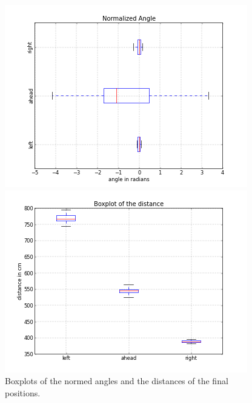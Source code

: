 \documentclass{scrartcl}
\begin{document}
\begin{figure}[H]
\centering
\begin{minipage}{.5\textwidth}
  \centering
  \includegraphics[width=.8\linewidth]{img/BoxplotAngleNorm_f.png}
\end{minipage}%
\begin{minipage}{.5\textwidth}
  \centering
  \includegraphics[width=.8\linewidth]{img/BoxplotDistance_f.png}
\end{minipage}
\caption{Boxplots of the normed angles and the distances of the final positions.}
\label{fig:right}
\end{figure}
\end{document}
